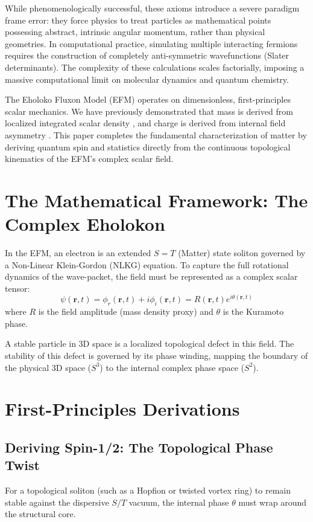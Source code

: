 \documentclass[11pt, twoside]{article}
\begin{document}
While phenomenologically successful, these axioms introduce a severe paradigm frame error: they force physics to treat particles as mathematical points possessing abstract, intrinsic angular momentum, rather than physical geometries. In computational practice, simulating multiple interacting fermions requires the construction of completely anti-symmetric wavefunctions (Slater determinants). The complexity of these calculations scales factorially, imposing a massive computational limit on molecular dynamics and quantum chemistry.

The Eholoko Fluxon Model (EFM) operates on dimensionless, first-principles scalar mechanics. We have previously demonstrated that mass is derived from localized integrated scalar density \citep{emvula2025mass}, and charge is derived from internal field asymmetry \citep{emvula2026charge}. This paper completes the fundamental characterization of matter by deriving quantum spin and statistics directly from the continuous topological kinematics of the EFM's complex scalar field.

\section{The Mathematical Framework: The Complex Eholokon}

In the EFM, an electron is an extended $S=T$ (Matter) state soliton governed by a Non-Linear Klein-Gordon (NLKG) equation. To capture the full rotational dynamics of the wave-packet, the field must be represented as a complex scalar tensor:
\begin{equation}
    \psi(\mathbf{r}, t) = \phi_r(\mathbf{r}, t) + i\phi_i(\mathbf{r}, t) = R(\mathbf{r}, t) e^{i\theta(\mathbf{r}, t)}
\end{equation}
where $R$ is the field amplitude (mass density proxy) and $\theta$ is the Kuramoto phase.

A stable particle in 3D space is a localized topological defect in this field. The stability of this defect is governed by its phase winding, mapping the boundary of the physical 3D space ($S^3$) to the internal complex phase space ($S^2$). 

\section{First-Principles Derivations}

\subsection{Deriving Spin-1/2: The Topological Phase Twist}
For a topological soliton (such as a Hopfion or twisted vortex ring) to remain stable against the dispersive $S/T$ vacuum, the internal phase $\theta$ must wrap around the structural core. 
\end{document}
